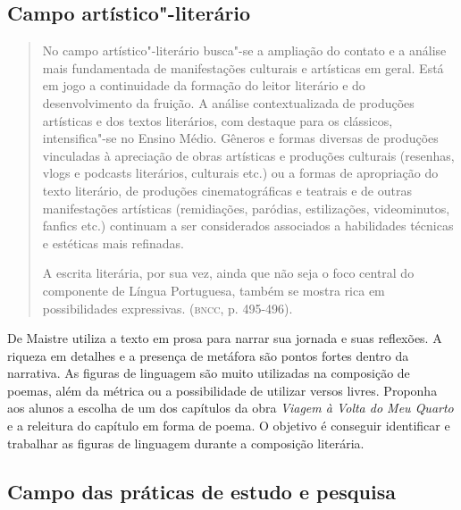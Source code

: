 \documentclass[12pt]{extarticle}
\begin{document}
\subsection{Campo artístico"-literário}

\begin{quote}
No campo artístico"-literário busca"-se a ampliação do contato e a
análise mais fundamentada de manifestações culturais e artísticas em
geral. Está em jogo a continuidade da formação do leitor literário e do
desenvolvimento da fruição. A análise contextualizada de produções
artísticas e dos textos literários, com destaque para os clássicos,
intensifica"-se no Ensino Médio. Gêneros e formas diversas de produções
vinculadas à apreciação de obras artísticas e produções culturais
(resenhas, vlogs e podcasts literários, culturais etc.) ou a formas de
apropriação do texto literário, de produções cinematográficas e teatrais
e de outras manifestações artísticas (remidiações, paródias,
estilizações, videominutos, fanfics etc.) continuam a ser considerados
associados a habilidades técnicas e estéticas mais refinadas.

A escrita literária, por sua vez, ainda que não seja o foco central do
componente de Língua Portuguesa, também se mostra rica em possibilidades
expressivas. (\textsc{bncc}, p. 495-496).
\end{quote}

De Maistre utiliza a texto em prosa para narrar sua jornada e suas
reflexões. A riqueza em detalhes e a presença de metáfora são pontos
fortes dentro da narrativa. As figuras de linguagem são muito
utilizadas na composição de poemas, além da métrica ou a possibilidade
de utilizar versos livres. Proponha aos alunos a escolha de um dos
capítulos da obra \emph{Viagem à Volta do Meu Quarto} e a releitura do
capítulo em forma de poema. O objetivo é conseguir identificar e
trabalhar as figuras de linguagem durante a composição literária.

\subsection{Campo das práticas de estudo e pesquisa}
\end{document}
